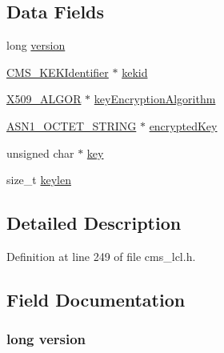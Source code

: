 \subsection*{Data Fields}
\begin{DoxyCompactItemize}
\item 
long \hyperlink{struct_c_m_s___k_e_k_recipient_info__st_a17afc5cf84cee4b2123665f28ce85c9f}{version}
\item 
\hyperlink{cms__lcl_8h_a34d0db06d618f85e5cc5a1053ffceda2}{C\+M\+S\+\_\+\+K\+E\+K\+Identifier} $\ast$ \hyperlink{struct_c_m_s___k_e_k_recipient_info__st_af39e57a3b2bf007d9c6792d7d54dae77}{kekid}
\item 
\hyperlink{crypto_2ossl__typ_8h_aa2b6185e6254f36f709cd6577fb5022e}{X509\+\_\+\+A\+L\+G\+OR} $\ast$ \hyperlink{struct_c_m_s___k_e_k_recipient_info__st_a02978e07483f6746f4f14141279dc4bb}{key\+Encryption\+Algorithm}
\item 
\hyperlink{crypto_2ossl__typ_8h_afbd05e94e0f0430a2b729473efec88c1}{A\+S\+N1\+\_\+\+O\+C\+T\+E\+T\+\_\+\+S\+T\+R\+I\+NG} $\ast$ \hyperlink{struct_c_m_s___k_e_k_recipient_info__st_a683d211b1506ecf342fb4d35a34aed33}{encrypted\+Key}
\item 
unsigned char $\ast$ \hyperlink{struct_c_m_s___k_e_k_recipient_info__st_a1cb5ee363f3d6d0f548eb6e64d72a7c8}{key}
\item 
size\+\_\+t \hyperlink{struct_c_m_s___k_e_k_recipient_info__st_af347fae5dae0b613448c54f3dea76ad2}{keylen}
\end{DoxyCompactItemize}


\subsection{Detailed Description}


Definition at line 249 of file cms\+\_\+lcl.\+h.



\subsection{Field Documentation}
\subsubsection[{\texorpdfstring{version}{version}}]{\setlength{\rightskip}{0pt plus 5cm}long version}\hypertarget{struct_c_m_s___k_e_k_recipient_info__st_a17afc5cf84cee4b2123665f28ce85c9f}{}\label{struct_c_m_s___k_e_k_recipient_info__st_a17afc5cf84cee4b2123665f28ce85c9f}


